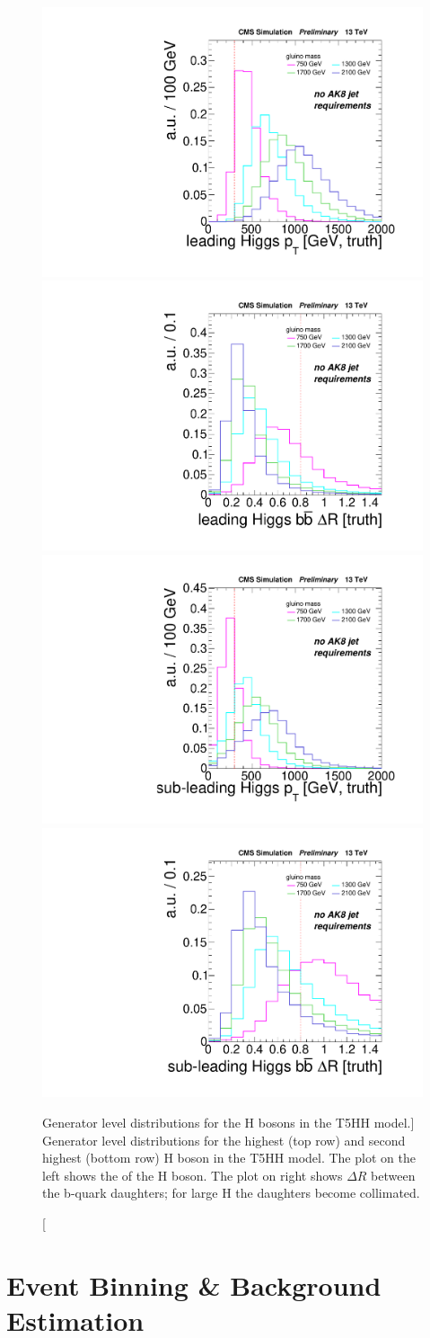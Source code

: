 \begin{figure}
\centering
\includegraphics[width=0.425\linewidth]{figs/leadHiggsPt.pdf}
\includegraphics[width=0.425\linewidth]{figs/leadHiggsDr.pdf}\\
\includegraphics[width=0.425\linewidth]{figs/subleadHiggsPt.pdf}
\includegraphics[width=0.425\linewidth]{figs/subleadHiggsDr.pdf}\\
\caption
[Generator level distributions for the H bosons in the T5HH model.]
{Generator level distributions for the highest (top row) and second highest (bottom row) \pt H boson in the T5HH model. The plot on the left shows the \pt of the H boson. The plot on right shows $\Delta R$ between the b-quark daughters; for large H \pt the daughters become collimated.}
\label{fig:GenHiggsBoost}
\end{figure}

\section{Event Binning \& Background Estimation}

